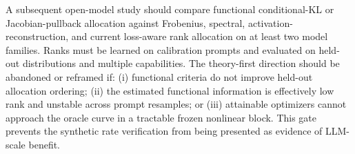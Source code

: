 A subsequent open-model study should compare functional conditional-KL or Jacobian-pullback allocation against Frobenius, spectral, activation-reconstruction, and current loss-aware rank allocation on at least two model families. Ranks must be learned on calibration prompts and evaluated on held-out distributions and multiple capabilities. The theory-first direction should be abandoned or reframed if: (i) functional criteria do not improve held-out allocation ordering; (ii) the estimated functional information is effectively low rank and unstable across prompt resamples; or (iii) attainable optimizers cannot approach the oracle curve in a tractable frozen nonlinear block. This gate prevents the synthetic rate verification from being presented as evidence of LLM-scale benefit.
